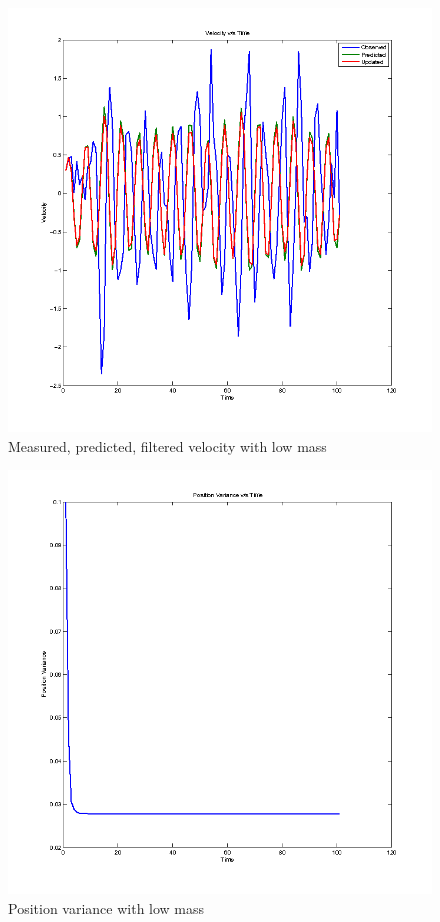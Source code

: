 \documentclass[12pt]{article}
\begin{document}
\begin{figure}
    \includegraphics[width=\linewidth]{kalman-velocity-m1}
    \caption{Measured, predicted, filtered velocity with low mass}
\end{figure}

\begin{figure}
    \includegraphics[width=\linewidth]{kalman-variance1-m1}
    \caption{Position variance with low mass}
\end{figure}
\end{document}
